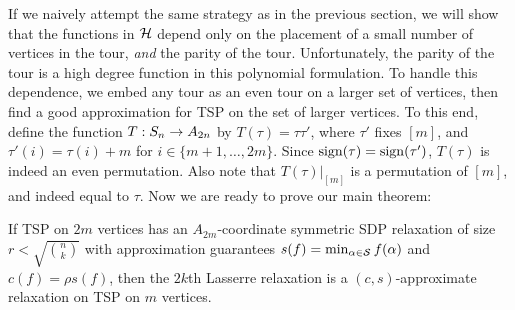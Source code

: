 If we naively attempt the same strategy as in the previous section, we will show that the functions in $\mathcal H$ depend only on the placement of a small number of vertices in the tour, \emph{and} the parity of the tour. Unfortunately, the parity of the tour is a high degree function in this polynomial formulation. To handle this dependence, we embed any tour as an even tour on a larger set of vertices, then find a good approximation for \textsc{TSP} on the set of larger vertices. To this end, define the function $T: S_{n} \rightarrow A_{2n}$ by $T(\tau) = \tau \tau'$, where $\tau'$ fixes $[m]$, and $\tau'(i) = \tau(i)+m$ for $i \in \{m+1,\dots,2m\}$. Since $\operatorname{sign}(\tau) = \operatorname{sign}(\tau')$, $T(\tau)$ is indeed an even permutation. Also note that $T(\tau)|_{[m]}$ is a permutation of $[m]$, and indeed equal to $\tau$. Now we are ready to prove our main theorem:
\begin{theorem}\label{thm:tsp-opt}
If \textsc{TSP} on $2m$ vertices has an $A_{2m}$-coordinate symmetric SDP relaxation of size $r < \sqrt{\binom{n}{k}}$ with approximation guarantees $s(f) = \min_{\alpha \in \mathcal S} f(\alpha)$ and $c(f) = \rho s(f)$, then the $2k$th Lasserre relaxation is a $(c,s)$-approximate relaxation on \textsc{TSP} on $m$ vertices.
\end{theorem}

